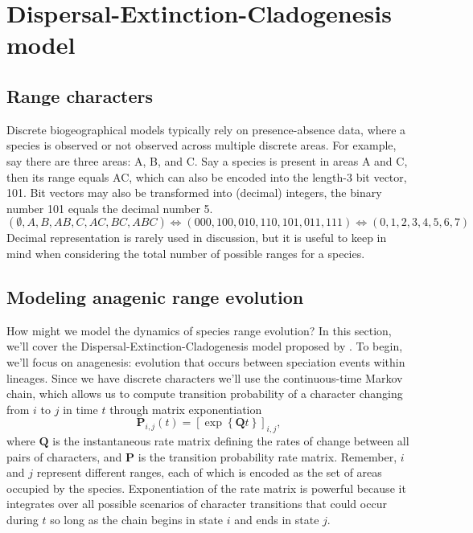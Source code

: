 \section{Dispersal-Extinction-Cladogenesis model}

\subsection{Range characters}

Discrete biogeographical models typically rely on presence-absence data, where a species is observed or not observed across multiple discrete areas.
For example, say there are three areas: A, B, and C.
Say a species is present in areas A and C, then its range equals AC, which can also be encoded into the length-3 bit vector, 101.
Bit vectors may also be transformed into (decimal) integers, \EG the binary number 101 equals the decimal number 5.
\[
( \emptyset, A, B, AB, C, AC, BC, ABC ) \Leftrightarrow (000,100,010,110,101,011,111) \Leftrightarrow ( 0, 1, 2, 3, 4, 5, 6, 7 )
\]
Decimal representation is rarely used in discussion, but it is useful to keep in mind when considering the total number of possible ranges for a species.

\subsection{Modeling anagenic range evolution}

How might we model the dynamics of species range evolution?
In this section, we'll cover the Dispersal-Extinction-Cladogenesis model proposed by \citet{ree05}.
To begin, we'll focus on anagenesis: evolution that occurs between speciation events within lineages.
Since we have discrete characters we'll use the continuous-time Markov chain, which allows us to compute transition probability of a character changing from $i$ to $j$ in time $t$ through matrix exponentiation
\[
\mathbf{P}_{i,j}(t) = \left[ \exp \left\lbrace \mathbf{Q}t \right\rbrace \right]_{i,j},
\]
where $\textbf{Q}$ is the instantaneous rate matrix defining the rates of change between all pairs of characters, and $\textbf{P}$ is the transition probability rate matrix.
Remember, $i$ and $j$ represent different ranges, each of which is encoded as the set of areas occupied by the species.
Exponentiation of the rate matrix is powerful because it integrates over all possible scenarios of character transitions that could occur during $t$ so long as the chain begins in state $i$ and ends in state $j$.

